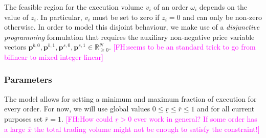 \documentclass[11pt,parskip=full]{scrartcl}%
\newcommand{\FH}[1]{\textcolor{magenta}{[FH:#1]}}
\begin{document}
The feasible region for the execution volume $ v_i $ of an order $ \omega_i $ depends on the value
of $ z_i $.
In particular, $ v_i $ must be set to zero if $ z_i = 0 $ and can only be non-zero otherwise.
In order to model this disjoint behaviour, we make use of a \emph{disjunctive programming}
formulation that requires the auxiliary non-negative price variable vectors
$ \mathbf{p}^{b,0}, \mathbf{p}^{b,1}, \mathbf{p}^{s,0}, \mathbf{p}^{s,1} \in \mathbb{R}^N_{\ge 0}
$.
\FH{seems to be an standard trick to go from bilinear to mixed integer linear}

\subsubsection*{Parameters}

The model allows for setting a minimum and maximum fraction of execution for every order.
For now, we will use global values $ 0 \le \underline{r} \le \overline{r} \le 1 $ and for all
current purposes set $ \overline{r} = 1 $.
\FH{How could $\underline{r} > 0$ ever work in general? If some order has a large $\overline{x}$ the total trading volume might not be enough to satisfy the constraint!}
\end{document}
